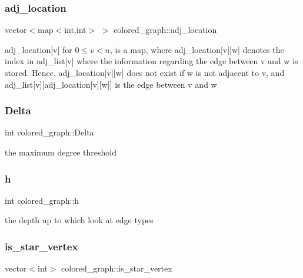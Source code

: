 \subsubsection{\texorpdfstring{adj\+\_\+location}{adj\_location}}
{\footnotesize\ttfamily vector$<$map$<$int,int$>$ $>$ colored\+\_\+graph\+::adj\+\_\+location}



adj\+\_\+location\mbox{[}v\mbox{]} for $0 \leq v < n$, is a map, where adj\+\_\+location\mbox{[}v\mbox{]}\mbox{[}w\mbox{]} denotes the index in adj\+\_\+list\mbox{[}v\mbox{]} where the information regarding the edge between v and w is stored. Hence, adj\+\_\+location\mbox{[}v\mbox{]}\mbox{[}w\mbox{]} does not exist if w is not adjacent to v, and adj\+\_\+list\mbox{[}v\mbox{]}\mbox{[}adj\+\_\+location\mbox{[}v\mbox{]}\mbox{[}w\mbox{]}\mbox{]} is the edge between v and w 

\mbox{\label{classcolored__graph_a5b0e93eb40a20dc815c809dee11edc12}} 
\subsubsection{\texorpdfstring{Delta}{Delta}}
{\footnotesize\ttfamily int colored\+\_\+graph\+::\+Delta}



the maximum degree threshold 

\mbox{\label{classcolored__graph_ae27062a4ee59df2670d3a0c81e85a3fa}} 
\subsubsection{\texorpdfstring{h}{h}}
{\footnotesize\ttfamily int colored\+\_\+graph\+::h}



the depth up to which look at edge types 

\mbox{\label{classcolored__graph_a00d0c64fcf8de58553aa4cade64193df}} 
\subsubsection{\texorpdfstring{is\+\_\+star\+\_\+vertex}{is\_star\_vertex}}
{\footnotesize\ttfamily vector$<$int$>$ colored\+\_\+graph\+::is\+\_\+star\+\_\+vertex}



